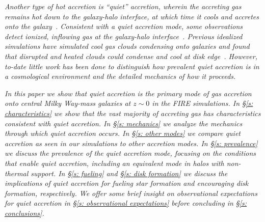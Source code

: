 \documentclass[fleqn,usenatbib]{mnras}
\begin{document}
\textit{
Another type of hot accretion is ``quiet'' accretion, wherein the accreting gas remains hot down to the galaxy-halo interface, at which time it cools and accretes onto the galaxy~\citep{Putman2012}.
Consistent with a quiet accretion mode, some observations detect ionized, inflowing gas at the galaxy-halo interface~\citep{Zheng2017}.
Previous idealized simulations have simulated cool gas clouds condensing onto galaxies and found that disrupted and heated clouds could condense and cool at disk edge~\citep{Heitsch2009}.
However, to-date little work has been done to distinguish how prevalent quiet accretion is in a cosmological environment and the detailed mechanics of how it proceeds.
}

\textit{
In this paper we show that quiet accretion is the primary mode of gas accretion onto central Milky Way-mass galaxies at $z \sim 0$ in the FIRE simulations.
In \S\ref{s: characteristics} we show that the vast majority of accreting gas has characteristics consistent with quiet accretion.
In \S\ref{s: mechanics} we analyze the mechanics through which quiet accretion occurs.
In \S\ref{s: other modes} we compare quiet accretion as seen in our simulations to other accretion modes.
In \S\ref{s: prevalence} we discuss the prevalence of the quiet accretion mode, focusing on the conditions that enable quiet accretion, including an equivalent mode in halos with non-thermal support.
In \S\ref{s: fueling} and \S\ref{s: disk formation} we discuss the implications of quiet accretion for fueling star formation and encouraging disk formation, respectively.
We offer some brief insight on observational expectations for quiet accretion in \S\ref{s: observational expectations} before concluding in \S\ref{s: conclusions}.
}


\end{document}
